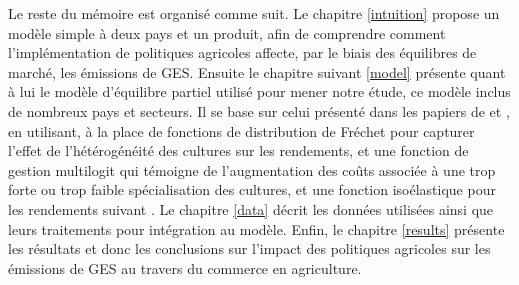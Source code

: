Le reste du mémoire est organisé comme suit. Le chapitre \ref{intuition} propose un modèle simple à deux pays et un produit, afin de comprendre comment l’implémentation de politiques agricoles affecte, par le biais des équilibres de marché, les émissions de GES. Ensuite le chapitre suivant \ref{model} présente quant à lui le modèle d’équilibre partiel utilisé pour mener notre étude, ce modèle inclus de nombreux pays et secteurs. Il se base sur celui présenté dans les papiers de \cite{Gouel2021} et \cite{Gouel2025}, en utilisant, à la place de fonctions de distribution de Fréchet pour capturer l’effet de l’hétérogénéité des cultures sur les rendements, et une fonction de gestion multilogit qui témoigne de l’augmentation des coûts associée à une trop forte ou trop faible spécialisation des cultures, et une fonction isoélastique pour les rendements suivant \cite{Carpentier2013}. Le chapitre \ref{data} décrit les données utilisées ainsi que leurs traitements pour intégration au modèle. Enfin, le chapitre \ref{results} présente les résultats et donc les conclusions sur l’impact des politiques agricoles sur les émissions de GES au travers du commerce en agriculture.
